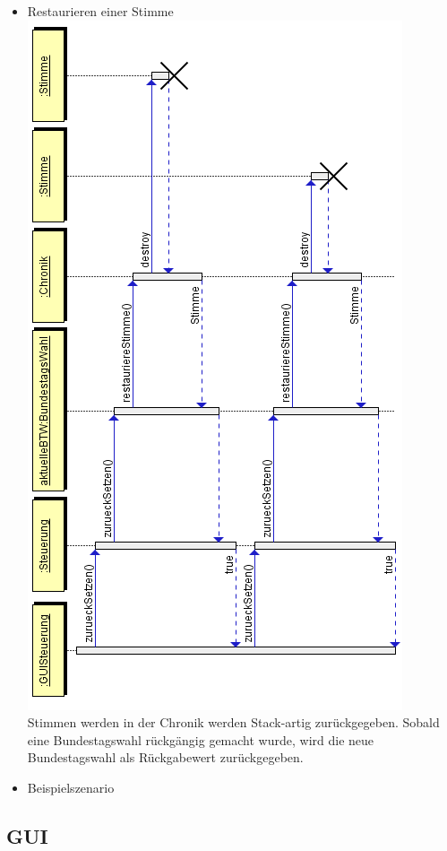 \documentclass[12pt,a4paper,titlepage]{article}
\begin{document}
\begin{itemize}
	\item Restaurieren einer Stimme \\
		\includegraphics[scale=0.7]{Chronik_Sequenzdiagramm-restaurieren.png}
		\\
		Stimmen werden in der Chronik werden Stack-artig zurückgegeben. Sobald eine Bundestagswahl rückgängig gemacht wurde, wird die neue Bundestagswahl als Rückgabewert zurückgegeben.
	\item Beispielszenario	
\end{itemize}

\subsection{GUI}
\end{document}
